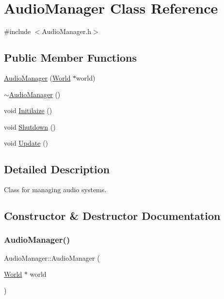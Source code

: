 \hypertarget{class_audio_manager}{}\section{Audio\+Manager Class Reference}
\label{class_audio_manager}


{\ttfamily \#include $<$Audio\+Manager.\+h$>$}

\subsection*{Public Member Functions}
\begin{DoxyCompactItemize}
\item 
\mbox{\hyperlink{class_audio_manager_ace4284dab1ad87e26b177dc57a7d357d}{Audio\+Manager}} (\mbox{\hyperlink{class_world}{World}} $\ast$world)
\item 
\mbox{\hyperlink{class_audio_manager_ad94dc46723c6d7cf8c81fc3772a842aa}{$\sim$\+Audio\+Manager}} ()
\item 
void \mbox{\hyperlink{class_audio_manager_a503509b0f62bd768f59f543bd52687d6}{Initilaize}} ()
\item 
void \mbox{\hyperlink{class_audio_manager_a8956677aeb7abb69b5254c2a89315f9f}{Shutdown}} ()
\item 
void \mbox{\hyperlink{class_audio_manager_a4dad07a2544905f1fd94fb4e2e4a34fc}{Update}} ()
\end{DoxyCompactItemize}


\subsection{Detailed Description}
Class for managing audio systems. 

\subsection{Constructor \& Destructor Documentation}
\mbox{\label{class_audio_manager_ace4284dab1ad87e26b177dc57a7d357d}} 
\subsubsection{\texorpdfstring{Audio\+Manager()}{AudioManager()}}
{\footnotesize\ttfamily Audio\+Manager\+::\+Audio\+Manager (\begin{DoxyParamCaption}\item[{\mbox{\hyperlink{class_world}{World}} $\ast$}]{world }\end{DoxyParamCaption})}

